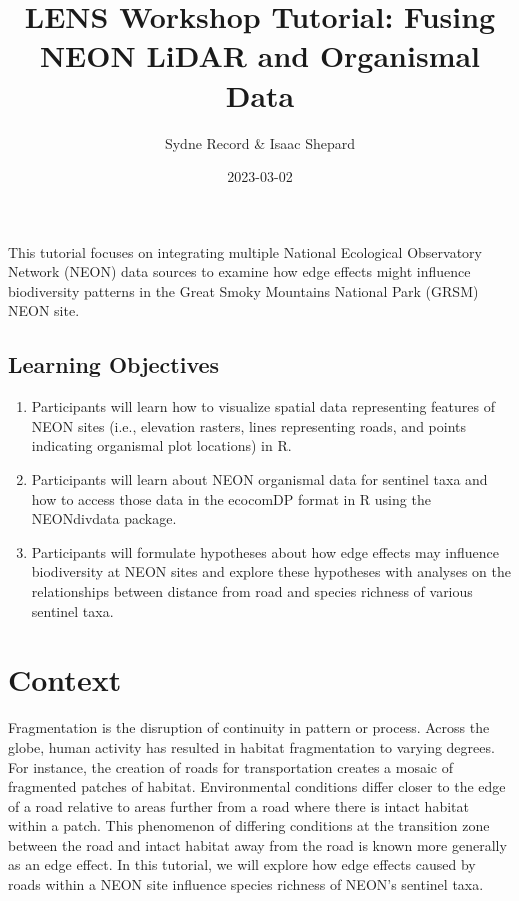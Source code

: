 \documentclass[
]{article}
\title{LENS Workshop Tutorial: Fusing NEON LiDAR and Organismal Data}
\author{Sydne Record \& Isaac Shepard}
\date{2023-03-02}
\providecommand{\tightlist}{%
  \setlength{\itemsep}{0pt}\setlength{\parskip}{0pt}}
\begin{document}
\maketitle

This tutorial focuses on integrating multiple National Ecological
Observatory Network (NEON) data sources to examine how edge effects
might influence biodiversity patterns in the Great Smoky Mountains
National Park (GRSM) NEON site.

\hypertarget{learning-objectives}{%
\subsection{Learning Objectives}\label{learning-objectives}}

\begin{enumerate}
\def\labelenumi{\arabic{enumi}.}
\tightlist
\item
  Participants will learn how to visualize spatial data representing
  features of NEON sites (i.e., elevation rasters, lines representing
  roads, and points indicating organismal plot locations) in R.
\item
  Participants will learn about NEON organismal data for sentinel taxa
  and how to access those data in the ecocomDP format in R using the
  NEONdivdata package.
\item
  Participants will formulate hypotheses about how edge effects may
  influence biodiversity at NEON sites and explore these hypotheses with
  analyses on the relationships between distance from road and species
  richness of various sentinel taxa.
\end{enumerate}

\hypertarget{context}{%
\section{Context}\label{context}}

Fragmentation is the disruption of continuity in pattern or process.
Across the globe, human activity has resulted in habitat fragmentation
to varying degrees. For instance, the creation of roads for
transportation creates a mosaic of fragmented patches of habitat.
Environmental conditions differ closer to the edge of a road relative to
areas further from a road where there is intact habitat within a patch.
This phenomenon of differing conditions at the transition zone between
the road and intact habitat away from the road is known more generally
as an edge effect. In this tutorial, we will explore how edge effects
caused by roads within a NEON site influence species richness of NEON's
sentinel taxa.
\end{document}

